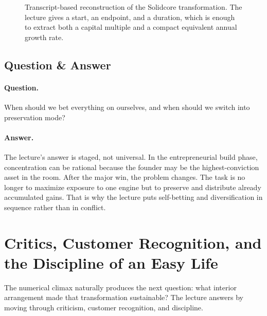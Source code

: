 \begin{figure}[h]
\centering
{}
\caption{Transcript-based reconstruction of the Solidcore transformation. The lecture gives a start, an endpoint, and a duration, which is enough to extract both a capital multiple and a compact equivalent annual growth rate.}
\end{figure}

\subsection{Question \& Answer}

\paragraph{Question.}
When should we bet everything on ourselves, and when should we switch into preservation mode?

\paragraph{Answer.}
The lecture's answer is staged, not universal. In the entrepreneurial build phase, concentration can be rational because the founder may be the highest-conviction asset in the room. After the major win, the problem changes. The task is no longer to maximize exposure to one engine but to preserve and distribute already accumulated gains. That is why the lecture puts self-betting and diversification in sequence rather than in conflict.

\section{Critics, Customer Recognition, and the Discipline of an Easy Life}

The numerical climax naturally produces the next question: what interior arrangement made that transformation sustainable? The lecture answers by moving through criticism, customer recognition, and discipline.

